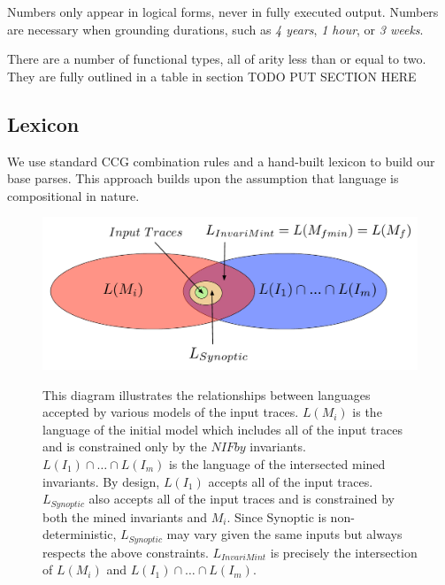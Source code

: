 \begin{definition}[Number]
Numbers only appear in logical forms, never in fully executed output. Numbers are necessary when grounding durations, such as \emph{4 years}, \emph{1 hour}, or \emph{3 weeks}. 
\end{definition}

\begin{definition}
There are a number of functional types, all of arity less than or equal to two. They are fully outlined in a table in section TODO PUT SECTION HERE
\end{definition}

\subsection{Lexicon}
We use standard CCG combination rules and a hand-built lexicon to build our base parses. This approach builds upon the assumption that language is compositional in nature.

\begin{figure}[t!]
   \center
   {\includegraphics[width=0.95\columnwidth]{fig/language-venn.pdf}}
   \caption{This diagram illustrates the relationships between languages
    accepted by various models of the input traces. $L(M_i)$ is the language of
    the initial model which includes all of the input traces and is constrained
    only by the $NIFby$ invariants.
    $L(I_1) \cap \ldots \cap L(I_m)$ is the language of the intersected mined
    invariants. By design, $L(I_1)$ accepts all of the input traces.
    $L_{Synoptic}$ also accepts all of the input traces and is constrained by
    both the mined invariants and $M_i$. 
    Since Synoptic is non-deterministic, $L_{Synoptic}$ may vary given the same
    inputs but always respects the above constraints.
    $L_{InvariMint}$ is precisely the intersection of $L(M_i)$ and $L(I_1) \cap
    \ldots \cap L(I_m)$.
   } 
   \label{fig:language-venn}
\end{figure}



